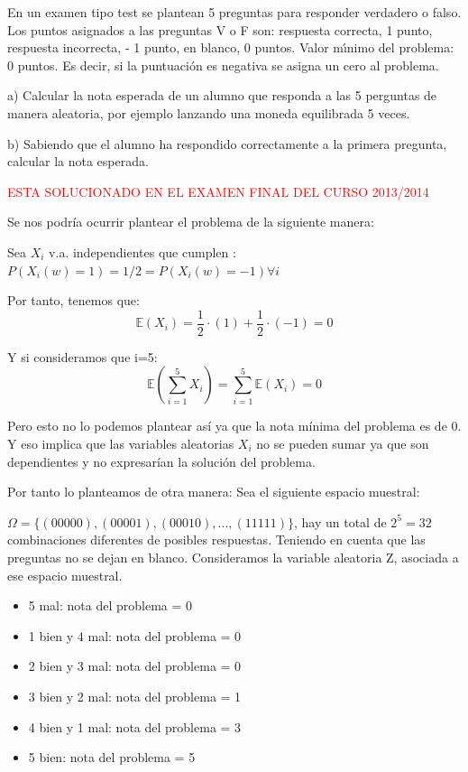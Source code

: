 \begin{problem}[3]En un examen tipo test se plantean 5 preguntas para responder verdadero o falso. 
 Los puntos asignados a las preguntas V o F son: respuesta correcta,
1 punto, respuesta incorrecta,
- 1 punto, en blanco, 0 puntos. Valor m\'{\i}nimo del  problema: 0 puntos. Es decir, si la puntuaci\'on es
negativa se asigna un cero al problema. 

a)  Calcular la nota esperada de un alumno que responda a las 5 perguntas
de manera aleatoria, por ejemplo lanzando una moneda equilibrada 5 veces.

b) Sabiendo que el  alumno ha respondido correctamente a  la
primera pregunta, calcular la nota esperada.
\solution

\textcolor{red}{ESTA SOLUCIONADO EN EL EXAMEN FINAL DEL CURSO 2013/2014}

\begin{expla}
Se nos podría ocurrir plantear el problema de la siguiente manera:

Sea $X_i$ v.a. independientes que cumplen : $P(X_i(w)=1)=1/2=P(X_i(w)=-1) \forall i$

Por tanto, tenemos que:
\[
\mathbb{E}(X_i)=\frac{1}{2}\cdot(1)+\frac{1}{2}\cdot(-1)=0
\] 

Y si consideramos que i=5:
\[
\mathbb{E}\left(\sum_{i=1}^{5}X_i\right)=\sum_{i=1}^{5}\mathbb{E}(X_i)=0
\]

Pero esto no lo podemos plantear así ya que la nota mínima del problema es de 0. Y eso implica que las variables aleatorias $X_i$ no se pueden sumar ya que son dependientes y no expresarían la solución del problema.

Por tanto lo planteamos de otra manera: Sea el siguiente espacio muestral:

$\Omega = \{(00000), (00001), (00010),..., (11111)\}$, hay un total de $2^5=32$ combinaciones diferentes de posibles respuestas. Teniendo en cuenta que las preguntas no se dejan en blanco. Consideramos la variable aleatoria Z, asociada a ese espacio muestral.

\end{expla}

\spart
\begin{itemize}
\item 5 mal: nota del problema = 0
\item 1 bien y 4 mal: nota del problema = 0
\item 2 bien y 3 mal: nota del problema = 0
\item 3 bien y 2 mal: nota del problema = 1
\item 4 bien y 1 mal: nota del problema = 3
\item 5 bien: nota del problema = 5
\end{itemize}


\end{problem}
